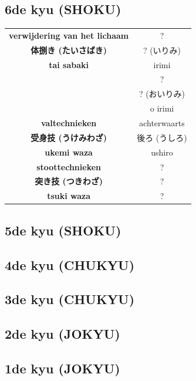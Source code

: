\documentclass[12pt]{scrartcl}
\begin{document}
\begin{CJK*}{UTF8}{min}
\subsection{6de kyu (SHOKU)}
\begin{table}[H]
\begin{center}
\begin{tabular}{c|c}
\textbf{verwijdering van het lichaam} & ?\\
\textbf{体捌き (たいさばき)} & ? (いりみ)\\
\textbf{tai sabaki} & irimi\\
\cline{2-2}
& ?\\
& ? (おいりみ)\\
& o irimi\\
\hline
\textbf{valtechnieken} & achterwaarts\\
\textbf{受身技 (うけみわざ)} & 後ろ (うしろ)\\
\textbf{ukemi waza} & ushiro\\
\hline
\textbf{stoottechnieken} & ?\\
\textbf{突き技 (つきわざ)} & ?\\
\textbf{tsuki waza} & ? \\
\hline
\end{tabular}
\end{center}
\label{kyu_6}
\end{table}

\newpage
\subsection{5de kyu (SHOKU)}

\newpage
\subsection{4de kyu (CHUKYU)}

\newpage
\subsection{3de kyu (CHUKYU)}

\newpage
\subsection{2de kyu (JOKYU)}

\newpage
\subsection{1de kyu (JOKYU)}


\end{CJK*}
\end{document}
